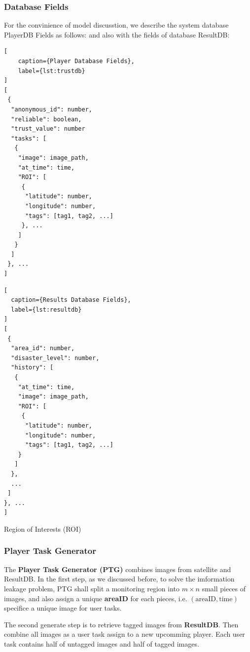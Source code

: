 \subsubsection{Database Fields}

  For the convinience of model discusstion, we describe the system database PlayerDB Fields as follows:
and also with the fields of database ResultDB:

\noindent\begin{minipage}{.45\textwidth}
\begin{lstlisting}[
    caption={Player Database Fields},
    label={lst:trustdb}
]
[
 {
  "anonymous_id": number,
  "reliable": boolean,
  "trust_value": number
  "tasks": [
   {
    "image": image_path,
    "at_time": time, 
    "ROI": [
     {
      "latitude": number,
      "longitude": number,
      "tags": [tag1, tag2, ...]
     }, ...
    ]
   }
  ]
 }, ...
]
\end{lstlisting}
\end{minipage}\hfill
\begin{minipage}{.45\textwidth}
\begin{lstlisting}[
  caption={Results Database Fields},
  label={lst:resultdb}
]
[
 {
  "area_id": number,
  "disaster_level": number,
  "history": [
   {
    "at_time": time,
    "image": image_path,
    "ROI": [
     {
      "latitude": number,
      "longitude": number,
      "tags": [tag1, tag2, ...]
    }
   ]
  }, 
  ...
 ]
}, ...
]
\end{lstlisting}
\end{minipage}

Region of Interests (ROI)

\subsubsection{Player Task Generator}

    The \textbf{Player Task Generator (PTG)} combines images from satellite and ResultDB. 
    In the first step, as we discussed before, to solve the imformation leakage problem,
    PTG shall split a monitoring region into $m\times n$ small pieces of images, and also assign a 
    unique \textbf{areaID} for each pieces, i.e. $(\text{areaID}, \text{time})$ 
    specifice a unique image for user tasks. 

    The second generate step is to retrieve tagged images from \textbf{ResultDB}. Then combine
    all images as a user task assign to a new upcomming player. Each user task contains 
    half of untagged images and half of tagged images.

